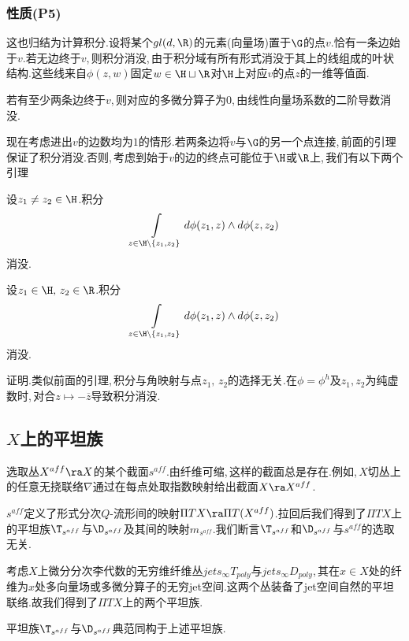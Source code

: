 \subsubsection{性质(P5)}

这也归结为计算积分.设将某个$gl(d,\R)$的元素(向量场)置于$\G$的点$v$.恰有一条边始于$v$.若无边终于$v$,\,则积分消没,\,由于积分域有所有形式消没于其上的线组成的叶状结构.这些线来自$\phi(z,w)$固定$w\in \H\sqcup  \R$对$\H$上对应$v$的点$z$的一维等值面.

若有至少两条边终于$v$,\,则对应的多微分算子为$0$,\,由线性向量场系数的二阶导数消没.

现在考虑进出$v$的边数均为$1$的情形.若两条边将$v$与$\G$的另一个点连接,\,前面的引理保证了积分消没.否则,\,考虑到始于$v$的边的终点可能位于$\H$或$\R$上,\,我们有以下两个引理

\begin{lemma}
设$z_1\ne z_2\in\H$.积分
$$\int\limits_{z\in \H\setminus\{z_1,z_2\}} d\phi(z_1,z) \wedge d\phi(z,z_2)$$
消没.
\end{lemma}

\begin{lemma}
设$z_1\in \H,\, z_2\in\R$.积分
$$\int\limits_{z\in \H\setminus\{z_1,z_2\}} d\phi(z_1,z)  \wedge d\phi(z,z_2)$$
消没.
\end{lemma}

证明.类似前面的引理,\,积分与角映射与点$z_1,\,z_2$的选择无关.在$\phi=\phi^h$及$z_1,z_2$为纯虚数时,\,对合$z\mapsto -{\overline z}$导致积分消没.


\subsection{$X$上的平坦族}

选取丛$X^{aff}\ra X$的某个截面$s^{aff}$.由纤维可缩,\,这样的截面总是存在.例如,\,$X$切丛上的任意无挠联络$\nabla$通过在每点处取指数映射给出截面$X\ra X^{aff}$.

$s^{aff}$定义了形式分次$Q$-流形间的映射$\Pi TX\ra \Pi T (X^{aff})$.拉回后我们得到了$\Pi TX$上的平坦族$\T_{s^{aff}}$与$\D_{s^{aff}}$及其间的映射$m_{s^{aff}}$.我们断言$\T_{s^{aff}}$和$\D_{s^{aff}}$与$s^{aff}$的选取无关.

考虑$X$上微分分次李代数的无穷维纤维丛$jets_{\infty} T_{poly}$与$jets_{\infty} D_{poly}$,\,其在$x\in X$处的纤维为$x$处多向量场或多微分算子的无穷jet空间.这两个丛装备了jet空间自然的平坦联络.故我们得到了$\Pi TX$上的两个平坦族.

\begin{lem}
平坦族$\T_{s^{aff}}$与$\D_{s^{aff}}$典范同构于上述平坦族.
\end{lem}

